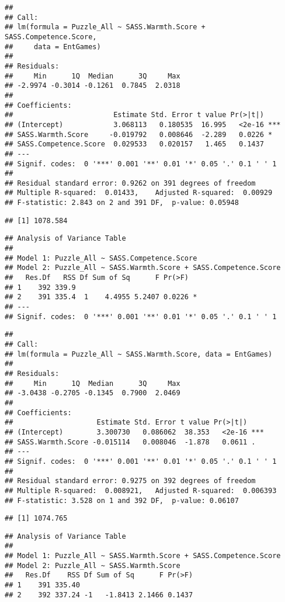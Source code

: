 \documentclass[
  doc,draftall]{apa6}
\begin{document}
\begin{verbatim}
## 
## Call:
## lm(formula = Puzzle_All ~ SASS.Warmth.Score + SASS.Competence.Score, 
##     data = EntGames)
## 
## Residuals:
##     Min      1Q  Median      3Q     Max 
## -2.9974 -0.3014 -0.1261  0.7845  2.0318 
## 
## Coefficients:
##                        Estimate Std. Error t value Pr(>|t|)    
## (Intercept)            3.068113   0.180535  16.995   <2e-16 ***
## SASS.Warmth.Score     -0.019792   0.008646  -2.289   0.0226 *  
## SASS.Competence.Score  0.029533   0.020157   1.465   0.1437    
## ---
## Signif. codes:  0 '***' 0.001 '**' 0.01 '*' 0.05 '.' 0.1 ' ' 1
## 
## Residual standard error: 0.9262 on 391 degrees of freedom
## Multiple R-squared:  0.01433,    Adjusted R-squared:  0.00929 
## F-statistic: 2.843 on 2 and 391 DF,  p-value: 0.05948
\end{verbatim}

\begin{verbatim}
## [1] 1078.584
\end{verbatim}

\begin{verbatim}
## Analysis of Variance Table
## 
## Model 1: Puzzle_All ~ SASS.Competence.Score
## Model 2: Puzzle_All ~ SASS.Warmth.Score + SASS.Competence.Score
##   Res.Df   RSS Df Sum of Sq      F Pr(>F)  
## 1    392 339.9                             
## 2    391 335.4  1    4.4955 5.2407 0.0226 *
## ---
## Signif. codes:  0 '***' 0.001 '**' 0.01 '*' 0.05 '.' 0.1 ' ' 1
\end{verbatim}

\begin{verbatim}
## 
## Call:
## lm(formula = Puzzle_All ~ SASS.Warmth.Score, data = EntGames)
## 
## Residuals:
##     Min      1Q  Median      3Q     Max 
## -3.0438 -0.2705 -0.1345  0.7900  2.0469 
## 
## Coefficients:
##                    Estimate Std. Error t value Pr(>|t|)    
## (Intercept)        3.300730   0.086062  38.353   <2e-16 ***
## SASS.Warmth.Score -0.015114   0.008046  -1.878   0.0611 .  
## ---
## Signif. codes:  0 '***' 0.001 '**' 0.01 '*' 0.05 '.' 0.1 ' ' 1
## 
## Residual standard error: 0.9275 on 392 degrees of freedom
## Multiple R-squared:  0.008921,   Adjusted R-squared:  0.006393 
## F-statistic: 3.528 on 1 and 392 DF,  p-value: 0.06107
\end{verbatim}

\begin{verbatim}
## [1] 1074.765
\end{verbatim}

\begin{verbatim}
## Analysis of Variance Table
## 
## Model 1: Puzzle_All ~ SASS.Warmth.Score + SASS.Competence.Score
## Model 2: Puzzle_All ~ SASS.Warmth.Score
##   Res.Df    RSS Df Sum of Sq      F Pr(>F)
## 1    391 335.40                           
## 2    392 337.24 -1   -1.8413 2.1466 0.1437
\end{verbatim}
\end{document}
